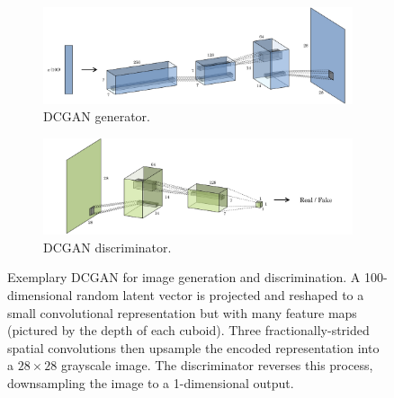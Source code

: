 \begin{figure}
	\centering	
	\begin{subfigure}{\textwidth}
    \centering
    \includegraphics[width=1\textwidth]{graphics/gan/dcgan/dcgan_g.pdf}
    \caption{DCGAN generator.}
    \label{subfig:dcgan_g}
  \end{subfigure}
 
	\begin{subfigure}{\textwidth}
    \centering
    \includegraphics[width=1\textwidth]{graphics/gan/dcgan/dcgan_d.pdf}
    \caption{DCGAN discriminator.}
    \label{subfig:dcgan_d}
  \end{subfigure}
  
  \caption[Constrained DCGAN architecture.]{Exemplary DCGAN for image generation and discrimination. A 100-dimensional random latent vector is projected and reshaped to a small convolutional representation but with many feature maps (pictured by the depth of each cuboid). Three fractionally-strided spatial convolutions then upsample the encoded representation into a $28 \times 28$ grayscale image. The discriminator reverses this process, downsampling the image to a 1-dimensional output.}
  \label{fig:dcgan}
\end{figure}


